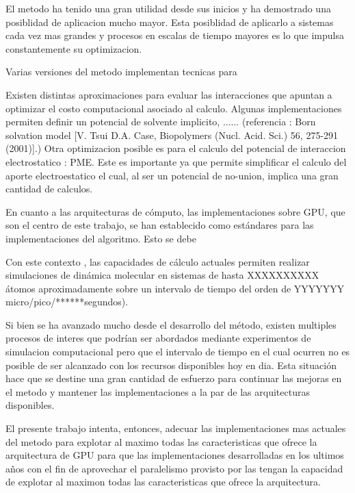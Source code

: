 \documentclass[a4paper,10pt]{report}
\begin{document}

El metodo ha tenido una gran utilidad desde sus inicios y ha demostrado una posiblidad de aplicacion mucho mayor. Esta posiblidad de aplicarlo a sistemas cada vez mas grandes y procesos en escalas de tiempo mayores es lo que impulsa constantemente su optimizacion.



Varias versiones del metodo implementan tecnicas para 

Existen distintas aproximaciones para evaluar las interacciones que apuntan a optimizar el costo computacional asociado al calculo. 
Algunas implementaciones permiten definir un potencial de solvente implicito, ...... (referencia : Born solvation model [V. Tsui  D.A. Case, Biopolymers (Nucl. Acid. Sci.) 56, 275-291 (2001)].)
Otra optimizacion posible es para el calculo del potencial de interaccion electrostatico : PME. Este es importante ya que permite simplificar el calculo del aporte electroestatico el cual, al ser un potencial de no-union, implica una gran cantidad de calculos.






En cuanto a las arquitecturas de cómputo, las implementaciones sobre GPU, que son el centro de este trabajo, se han establecido como estándares para las implementaciones del algoritmo. Esto se debe 


Con este contexto , las capacidades de cálculo actuales permiten realizar simulaciones de dinámica molecular en sistemas de hasta XXXXXXXXXX átomos aproximadamente sobre un intervalo de tiempo del orden de YYYYYYY  micro/pico/******segundos).

Si bien se ha avanzado mucho desde el desarrollo del método, existen multiples procesos de interes que podrían ser abordados mediante experimentos de simulacion computacional pero que el intervalo de tiempo en el cual ocurren no es posible de ser alcanzado con los recursos disponibles hoy en dia.
Esta situación hace que se destine una gran cantidad de esfuerzo para continuar las mejoras en el metodo y mantener las implementaciones a la par de las arquitecturas disponibles.

El presente trabajo intenta, entonces, adecuar las implementaciones mas actuales del metodo para explotar al maximo todas las caracteristicas que ofrece la arquitectura de GPU 
para que las implementaciones desarrolladas en los ultimos años con el fin de aprovechar el paralelismo provisto por las   tengan la capacidad de explotar al maximon todas las caracteristicas que ofrece la arquitectura.
\end{document}
